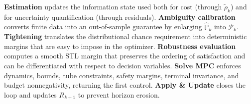\documentclass[journal]{IEEEtran}
\theoremstyle{definition}
\begin{document}
 
\textbf{Estimation} updates the information state used both for cost (through
$\widetilde{\rho}_k$) and for uncertainty quantification (through residuals).
\textbf{Ambiguity calibration} converts finite data into an out-of-sample guarantee by
enlarging $\widehat{\mathbb{P}}_k$ into $\mathcal{P}_k$. 
\textbf{Tightening} translates the distributional chance requirement into deterministic
margins that are easy to impose in the optimizer.
\textbf{Robustness evaluation} computes a smooth STL margin that preserves the ordering
of satisfaction and can be differentiated with respect to decision variables.
\textbf{Solve MPC} enforces dynamics, bounds, tube constraints, safety margins, terminal
invariance, and budget nonnegativity, returning the first control.
\textbf{Apply \& Update} closes the loop and updates $R_{k+1}$ to prevent horizon erosion.
\end{document}

